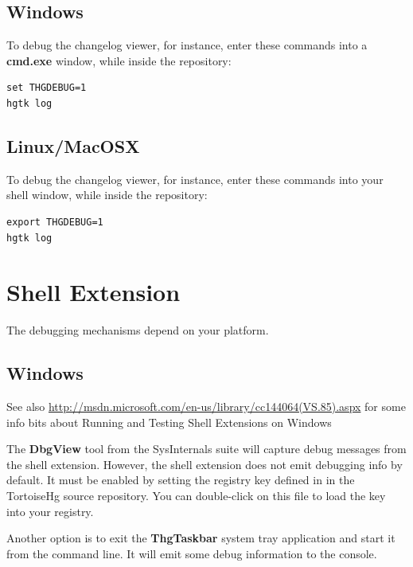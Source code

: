 \documentclass[letterpaper,10pt,english]{manual}
\begin{document}
\subsection{Windows}

To debug the changelog viewer, for instance, enter these commands
into a \textbf{cmd.exe} window, while inside the repository:

\begin{Verbatim}[commandchars=@\[\]]
set THGDEBUG=1
hgtk log
\end{Verbatim}


\subsection{Linux/MacOSX}

To debug the changelog viewer, for instance, enter these commands
into your shell window, while inside the repository:

\begin{Verbatim}[commandchars=@\[\]]
export THGDEBUG=1
hgtk log
\end{Verbatim}


\section{Shell Extension}

The debugging mechanisms depend on your platform.


\subsection{Windows}

See also \href{http://msdn.microsoft.com/en-us/library/cc144064(VS.85).aspx}{http://msdn.microsoft.com/en-us/library/cc144064(VS.85).aspx}
for some info bits about Running and Testing Shell Extensions on Windows

The \textbf{DbgView} tool from the SysInternals suite will capture
debug messages from the shell extension.  However, the shell
extension does not emit debugging info by default.  It must be enabled
by setting the registry key defined in
 in the TortoiseHg source
repository.  You can double-click on this file to load the key into your
registry.

Another option is to exit the \textbf{ThgTaskbar} system tray
application and start it from the command line.  It will emit some debug
information to the console.
\end{document}

